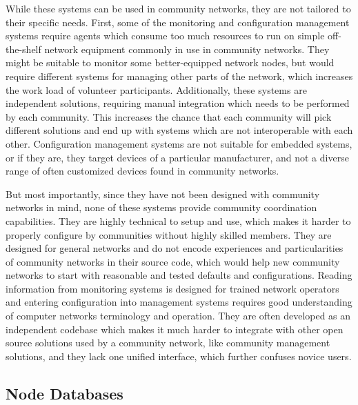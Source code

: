 \documentclass[5p,sort&compress]{elsarticle}
\begin{document}
While these systems can be used in community networks, they are not tailored to their specific needs.
First, some of the monitoring and configuration management systems require agents which consume too much resources to run on simple off-the-shelf network equipment commonly in use in community networks.
They might be suitable to monitor some better-equipped network nodes, but would require different systems for managing other parts of the network, which increases the work load of volunteer participants.
Additionally, these systems are independent solutions, requiring manual integration which needs to be performed by each community.
This increases the chance that each community will pick different solutions and end up with systems which are not interoperable with each other.
Configuration management systems are not suitable for embedded systems, or if they are, they target devices of a particular manufacturer, and not a diverse range of often customized devices found in community networks.

But most importantly, since they have not been designed with community networks in mind, none of these systems provide community coordination capabilities.
They are highly technical to setup and use, which makes it harder to properly configure by communities without highly skilled members.
They are designed for general networks and do not encode experiences and particularities of community networks in their source code, which would help new community networks to start with reasonable and tested defaults and configurations.
Reading information from monitoring systems is designed for trained network operators and entering configuration into management systems requires good understanding of computer networks terminology and operation.
They are often developed as an independent codebase which makes it much harder to integrate with other open source solutions used by a community network, like community management solutions, and they lack one unified interface, which further confuses novice users.

\subsection{Node Databases}
\end{document}
